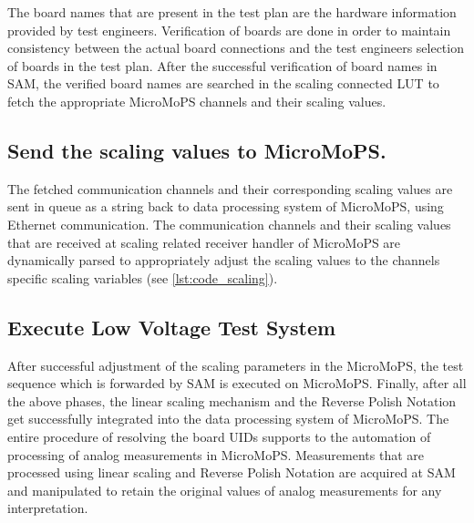 The board names that are present in the test plan are the hardware information provided by test engineers. 
Verification of boards are done in order to maintain consistency between the actual board connections and the test engineers selection of boards in the test plan. %
After the successful verification of board names in SAM, the verified board names are searched in the scaling connected \gls{LUT} to fetch the appropriate MicroMoPS channels and their scaling values.  

\subsection{Send the scaling values to MicroMoPS.}\label{sec:send}
The fetched communication channels and their corresponding scaling values are sent in queue as a string back to data processing system of MicroMoPS, using Ethernet communication.
The communication channels and their scaling values that are received at scaling related receiver handler of MicroMoPS are dynamically parsed to appropriately adjust the scaling values to the channels specific scaling variables (see \cref{lst:code_scaling}).
\subsection{Execute Low Voltage Test System}\label{sec:LowVoltage}
After successful adjustment of the scaling parameters in the MicroMoPS, the test sequence which is forwarded by SAM is executed on MicroMoPS. 
Finally, after all the above phases, the linear scaling mechanism and the Reverse Polish Notation get successfully integrated into the data processing system of MicroMoPS. 
The entire procedure of resolving the board UIDs supports to the automation of processing of analog measurements in MicroMoPS.
Measurements that are processed using linear scaling and Reverse Polish Notation are acquired at SAM and manipulated to retain the original values of analog measurements for any interpretation.
  